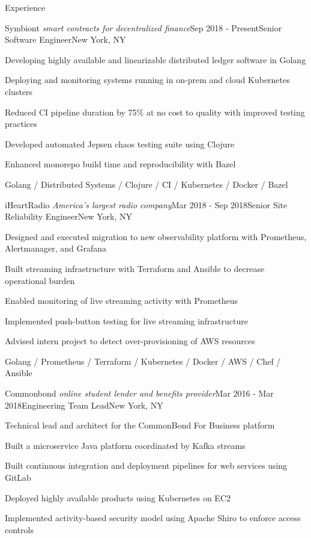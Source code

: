 \documentclass{resume} %
\begin{document}
\begin{rSection}{Experience}

\begin{rSubsection}{Symbiont \textit{\scriptsize smart contracts for decentralized finance}}{Sep 2018 - Present}{Senior Software Engineer}{New York, NY}
\item Developing highly available and linearizable distributed ledger software in Golang
\item Deploying and monitoring systems running in on-prem and cloud Kubernetes clusters
\item Reduced CI pipeline duration by 75\% at no cost to quality with improved testing practices
\item Developed automated Jepsen chaos testing suite using Clojure
\item Enhanced monorepo build time and reproducibility with Bazel

Golang / Distributed Systems / Clojure / CI / Kubernetes / Docker / Bazel
\end{rSubsection}


\begin{rSubsection}{iHeartRadio \textit{\scriptsize America's largest radio company}}{Mar 2018 - Sep 2018}{Senior Site Reliability Engineer}{New York, NY}
\item Designed and executed migration to new observability platform with Prometheus, Alertmanager, and Grafana
\item Built streaming infrastructure with Terraform and Ansible to decrease operational burden
\item Enabled monitoring of live streaming activity with Prometheus
\item Implemented push-button testing for live streaming infrastructure
\item Advised intern project to detect over-provisioning of AWS resources

Golang / Prometheus / Terraform / Kubernetes / Docker / AWS / Chef / Ansible
\end{rSubsection}


\begin{rSubsection}{Commonbond \textit{\scriptsize online student lender and benefits provider}}{Mar 2016 - Mar 2018}{Engineering Team Lead}{New York, NY}
\item Technical lead and architect for the CommonBond For Business platform
\item Built a microservice Java platform coordinated by Kafka streams
\item Built continuous integration and deployment pipelines for web services using GitLab
\item Deployed highly available products using Kubernetes on EC2
\item Implemented activity-based security model using Apache Shiro to enforce access controls


\end{rSubsection}
\end{rSection}
\end{document}
